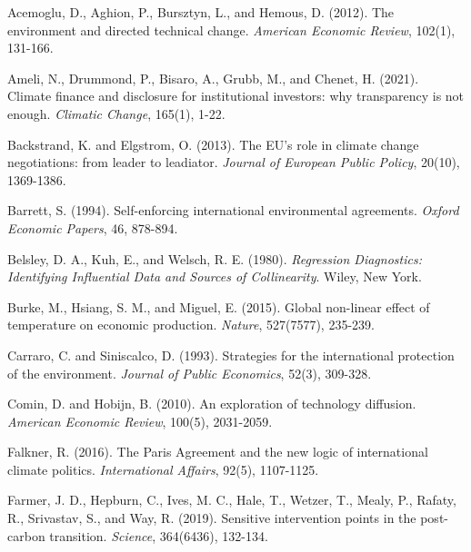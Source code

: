 \documentclass[10pt,a4paper]{article}
\begin{document}
\begin{list}{}{\setlength\leftmargin{1.5em}\setlength\itemindent{-1.5em}\setlength\itemsep{0.4em}}

\item Acemoglu, D., Aghion, P., Bursztyn, L., and Hemous, D. (2012). The environment and directed
technical change. \textit{American Economic Review}, 102(1), 131-166.

\item Ameli, N., Drummond, P., Bisaro, A., Grubb, M., and Chenet, H. (2021). Climate finance and
disclosure for institutional investors: why transparency is not enough. \textit{Climatic Change},
165(1), 1-22.

\item Backstrand, K. and Elgstrom, O. (2013). The EU's role in climate change negotiations: from leader
to leadiator. \textit{Journal of European Public Policy}, 20(10), 1369-1386.

\item Barrett, S. (1994). Self-enforcing international environmental agreements. \textit{Oxford Economic
Papers}, 46, 878-894.

\item Belsley, D. A., Kuh, E., and Welsch, R. E. (1980). \textit{Regression Diagnostics: Identifying
Influential Data and Sources of Collinearity}. Wiley, New York.

\item Burke, M., Hsiang, S. M., and Miguel, E. (2015). Global non-linear effect of temperature on
economic production. \textit{Nature}, 527(7577), 235-239.

\item Carraro, C. and Siniscalco, D. (1993). Strategies for the international protection of the environment.
\textit{Journal of Public Economics}, 52(3), 309-328.

\item Comin, D. and Hobijn, B. (2010). An exploration of technology diffusion. \textit{American Economic
Review}, 100(5), 2031-2059.

\item Falkner, R. (2016). The Paris Agreement and the new logic of international climate politics.
\textit{International Affairs}, 92(5), 1107-1125.

\item Farmer, J. D., Hepburn, C., Ives, M. C., Hale, T., Wetzer, T., Mealy, P., Rafaty, R., Srivastav, S.,
and Way, R. (2019). Sensitive intervention points in the post-carbon transition. \textit{Science},
364(6436), 132-134.


\end{list}
\end{document}
